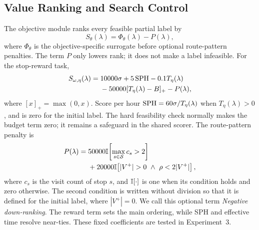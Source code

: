 \subsection{Value Ranking and Search Control}
The objective module ranks every feasible partial label by
\begin{equation}
    \label{eq:search_score}
    S_\theta(\lambda)=\Phi_\theta(\lambda)-P(\lambda),
\end{equation}
where \(\Phi_\theta\) is the objective-specific surrogate before optional
route-pattern penalties. The term \(P\) only lowers rank; it does not make a
label infeasible. For the stop-reward task,
\begin{equation}
    \label{eq:search_score_stop_reward}
    \begin{aligned}
        S_{\omega,\eta}(\lambda)={}&10000\sigma+5\,{\rm SPH}
        -0.1T_\eta(\lambda)\\
        &-50000[T_\eta(\lambda)-B]_+-P(\lambda),
    \end{aligned}
\end{equation}
where \([x]_+=\max(0,x)\). Score per hour
\({\rm SPH}=60\sigma/T_\eta(\lambda)\) when \(T_\eta(\lambda)>0\), and is zero
for the initial label. The hard feasibility check normally makes the budget
term zero; it remains a safeguard in the shared scorer. The route-pattern
penalty is
\begin{equation}
    \label{eq:negative_penalty}
    \begin{aligned}
    P(\lambda)={}&50000\ind\!\left[\max_{s\in\mathcal S} c_s>2\right]\\
    &+20000\ind\!\left[|V^+|>0\ \land\ \rho<2|V^+|\right],
    \end{aligned}
\end{equation}
where \(c_s\) is the visit count of stop \(s\), and \(\mathbb{I}[\cdot]\) is one
when its condition holds and zero otherwise. The second condition is written
without division so that it is defined for the initial label, where
\(|V^+|=0\). We call this optional term \emph{Negative down-ranking}.
The reward term sets the main ordering, while SPH and effective time resolve
near-ties. These fixed coefficients are tested in Experiment~3.

